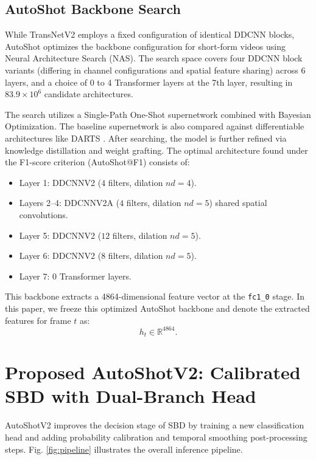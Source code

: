 \subsection{AutoShot Backbone Search}

While TransNetV2 employs a fixed configuration of identical DDCNN blocks, AutoShot \cite{zhu2023autoshot} optimizes the backbone configuration for short-form videos using Neural Architecture Search (NAS). The search space covers four DDCNN block variants (differing in channel configurations and spatial feature sharing) across 6 layers, and a choice of 0 to 4 Transformer layers \cite{vaswani2017attention} at the 7th layer, resulting in $83.9 \times 10^6$ candidate architectures. 

The search utilizes a Single-Path One-Shot supernetwork \cite{guo2020spos} combined with Bayesian Optimization. The baseline supernetwork is also compared against differentiable architectures like DARTS \cite{liu2019darts}. After searching, the model is further refined via knowledge distillation \cite{hinton2015distilling} and weight grafting. The optimal architecture found under the F1-score criterion (AutoShot@F1) consists of:
\begin{itemize}
    \item Layer 1: DDCNNV2 ($4$ filters, dilation $nd=4$).
    \item Layers 2--4: DDCNNV2A ($4$ filters, dilation $nd=5$) shared spatial convolutions.
    \item Layer 5: DDCNNV2 ($12$ filters, dilation $nd=5$).
    \item Layer 6: DDCNNV2 ($8$ filters, dilation $nd=5$).
    \item Layer 7: $0$ Transformer layers.
\end{itemize}
This backbone extracts a 4864-dimensional feature vector at the \texttt{fc1\_0} stage. In this paper, we freeze this optimized AutoShot backbone and denote the extracted features for frame $t$ as:
\begin{equation}
    h_t \in \mathbb{R}^{4864}.
\end{equation}

\section{Proposed AutoShotV2: Calibrated SBD with Dual-Branch Head}

AutoShotV2 improves the decision stage of SBD by training a new classification head and adding probability calibration and temporal smoothing post-processing steps. Fig. \ref{fig:pipeline} illustrates the overall inference pipeline.

